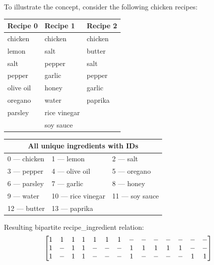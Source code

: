 \documentclass[conference]{IEEEtran}
\begin{document}
To illustrate the concept, consider the following chicken recipes:

\vspace{.5cm}
\begin{tabular}{ l|l|l }
   Recipe 0    & Recipe 1        & Recipe 2  \\
   \hline
   chicken     & chicken         & chicken   \\
   lemon       & salt            & butter    \\
   salt        & pepper          & salt      \\
   pepper      & garlic          & pepper    \\
   olive oil   & honey           & garlic    \\
   oregano     & water           & paprika   \\
   parsley     & rice vinegar    &           \\
               & soy sauce       &
\end{tabular}

\vspace{.5cm}
\begin{tabular}{ l l l }
   \multicolumn{3}{c}{All unique ingredients with IDs}          \\
   \hline
   0  --- chicken  & 1  --- lemon         & 2  --- salt         \\
   3  --- pepper   & 4  --- olive oil     & 5  --- oregano      \\
   6  --- parsley  & 7  --- garlic        & 8  --- honey        \\
   9  --- water    & 10 --- rice vinegar  & 11 --- soy sauce    \\
   12 --- butter   & 13 --- paprika       &
\end{tabular}

\vspace{.5cm}
Resulting bipartite recipe\_ingredient relation:
$$
   \setcounter{MaxMatrixCols}{15}
   \begin{bmatrix}
      1 & 1 & 1 & 1 & 1 & 1 & 1 & - & - & - & - & - & - & - \\
      1 & - & 1 & 1 & - & - & - & 1 & 1 & 1 & 1 & 1 & - & - \\
      1 & - & 1 & 1 & - & - & - & 1 & - & - & - & - & 1 & 1
   \end{bmatrix}
$$
\end{document}
